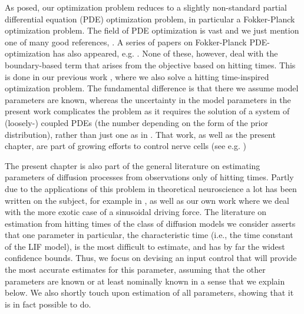As posed, our optimization problem reduces to a slightly non-standard partial
differential equation (PDE) optimization problem, in particular a Fokker-Planck
optimization problem. The field of PDE optimization is vast and we just mention
one of many good references, \cite{Borzi2012}. A series of papers on
Fokker-Planck PDE-optimization has also appeared, e.g.
\cite{Annunziato2010,Annunziato2014}. None of these, however, deal with the
boundary-based term that arises from the objective based on hitting times. This
is done in our previous work \cite{Iolov2014a}, where we also solve a hitting
time-inspired optimization problem. The fundamental difference is that there we
assume model parameters are known, whereas the uncertainty in the model
parameters in the present work complicates the problem as it requires the
solution of a system of (loosely-) coupled PDEs (the number depending on the
form of the prior distribution), rather than just one as in \cite{Iolov2014a}.
That work, as well as the present chapter, are part of growing efforts to control
nerve cells (see e.g. \cite{Ullah2009})

The present chapter is also part of the general literature on estimating
parameters of diffusion processes from observations only of hitting times.
Partly due to the applications of this problem in theoretical neuroscience a lot
has been written on the subject, for example in
\cite{Paninski2004,Ditlevsen2007,Lansky2008,MullowneyIyengar2008}, as well as
our own work \cite{Iolov2013} where we deal with the more exotic case of a
sinusoidal driving force. The literature on estimation from hitting times of the
class of diffusion models we consider asserts that one parameter in particular,
the characteristic time (i.e., the time constant of the LIF model), is the most
difficult to estimate, and has by far the widest confidence bounds. Thus, we
focus on devising an input control that will provide the most accurate estimates
for this parameter, assuming that the other parameters are known or at least
nominally known in a sense that we explain below. We also shortly touch upon
estimation of all parameters, showing that it is in fact possible to do.


